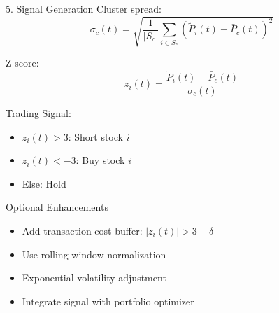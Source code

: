 \documentclass{beamer}
\begin{document}
\begin{frame}{5. Signal Generation}
Cluster spread:
\[
\sigma_c(t) = \sqrt{\frac{1}{|S_c|} \sum_{i \in S_c} (\tilde{P}_i(t) - \bar{P}_c(t))^2}
\]

Z-score:
\[
z_i(t) = \frac{\tilde{P}_i(t) - \bar{P}_c(t)}{\sigma_c(t)}
\]

Trading Signal:
\begin{itemize}
    \item $z_i(t) > 3$: Short stock $i$
    \item $z_i(t) < -3$: Buy stock $i$
    \item Else: Hold
\end{itemize}
\end{frame}

\begin{frame}{Optional Enhancements}
\begin{itemize}
    \item Add transaction cost buffer: $|z_i(t)| > 3 + \delta$
    \item Use rolling window normalization
    \item Exponential volatility adjustment
    \item Integrate signal with portfolio optimizer
\end{itemize}
\end{frame}
\end{document}
